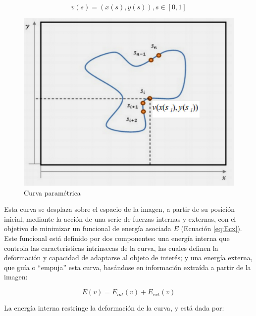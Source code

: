 %
\begin{equation}	
	v(s) = (x(s), y(s)), s \in [0,1]
\end{equation}
%


\begin{figure}[H]
	\centering
	\includegraphics[scale=0.05]{images/grafico_snake_parametrico.jpg}
	\caption{Curva paramétrica}
	\label{fig:curva_parametrica}
\end{figure}

Esta curva se desplaza sobre el espacio de la imagen, a partir de su posición inicial, mediante la acción de una serie de fuerzas internas y externas, con el objetivo de minimizar un funcional de energía asociada $E$ (Ecuación \ref{eq:Ecx}). Este funcional está definido por dos componentes: una energía interna que controla las características intrínsecas de la curva, las cuales definen la deformación y capacidad de adaptarse al objeto de interés; y una energía externa, que guía o “empuja” esta curva, basándose en información extraída a partir de la imagen:


%
\begin{equation}
	E(v) = E_{int}(v) + E_{ext}(v)
\label{eq:Ecx}
\end{equation}
%


La energía interna restringe la deformación de la curva, y está dada por:

